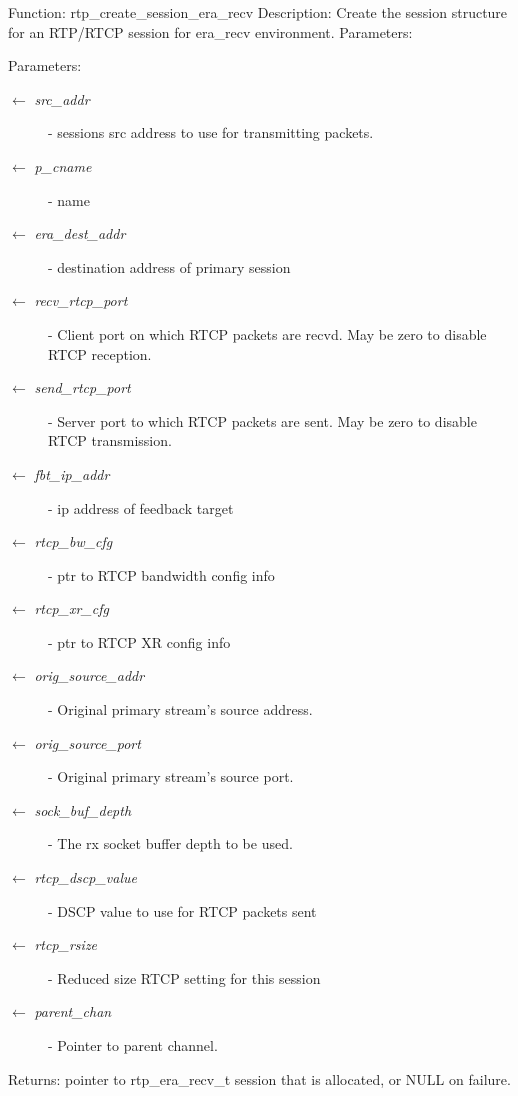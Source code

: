 Function: rtp\_\-create\_\-session\_\-era\_\-recv Description: Create the session structure for an RTP/RTCP session for era\_\-recv environment. Parameters: \begin{Desc}
\item[Parameters:]
\begin{description}
\item[\mbox{$\leftarrow$} {\em src\_\-addr}]- sessions src address to use for transmitting packets. \item[\mbox{$\leftarrow$} {\em p\_\-cname}]- name \item[\mbox{$\leftarrow$} {\em era\_\-dest\_\-addr}]- destination address of primary session \item[\mbox{$\leftarrow$} {\em recv\_\-rtcp\_\-port}]- Client port on which RTCP packets are recvd. May be zero to disable RTCP reception. \item[\mbox{$\leftarrow$} {\em send\_\-rtcp\_\-port}]- Server port to which RTCP packets are sent. May be zero to disable RTCP transmission. \item[\mbox{$\leftarrow$} {\em fbt\_\-ip\_\-addr}]- ip address of feedback target \item[\mbox{$\leftarrow$} {\em rtcp\_\-bw\_\-cfg}]- ptr to RTCP bandwidth config info \item[\mbox{$\leftarrow$} {\em rtcp\_\-xr\_\-cfg}]- ptr to RTCP XR config info \item[\mbox{$\leftarrow$} {\em orig\_\-source\_\-addr}]- Original primary stream's source address. \item[\mbox{$\leftarrow$} {\em orig\_\-source\_\-port}]- Original primary stream's source port. \item[\mbox{$\leftarrow$} {\em sock\_\-buf\_\-depth}]- The rx socket buffer depth to be used. \item[\mbox{$\leftarrow$} {\em rtcp\_\-dscp\_\-value}]- DSCP value to use for RTCP packets sent \item[\mbox{$\leftarrow$} {\em rtcp\_\-rsize}]- Reduced size RTCP setting for this session \item[\mbox{$\leftarrow$} {\em parent\_\-chan}]- Pointer to parent channel.\end{description}
\end{Desc}
\begin{Desc}
\item[Returns:]pointer to rtp\_\-era\_\-recv\_\-t session that is allocated, or NULL on failure. \end{Desc}
